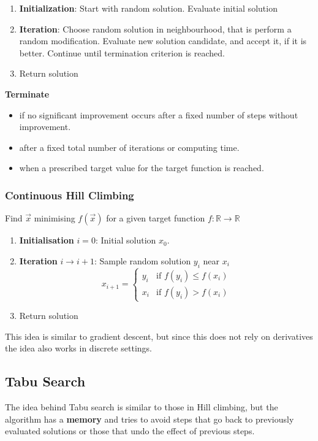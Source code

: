 \documentclass[11pt]{article}
\begin{document}
\begin{enumerate}
	\item \textbf{Initialization}: Start with random solution. Evaluate initial solution
	\item \textbf{Iteration}: Choose random solution in neighbourhood, that is perform a random modification. Evaluate new solution candidate, and accept it, if it is better. Continue until termination criterion is reached.
	\item Return solution
\end{enumerate}

\noindent
\textbf{Terminate}
\begin{itemize}
	\item if no significant improvement occurs after a fixed number of steps without improvement.
	\item after a fixed total number of iterations or computing time.
	\item when a prescribed target value for the target function is reached.
\end{itemize}

\subsubsection{Continuous Hill Climbing}
Find $\vec{x}$ minimising $f(\vec{x})$ for a given target function $f : \mathbb{R} \rightarrow \mathbb{R}$
\begin{enumerate}
	\item \textbf{Initialisation} $i=0$: Initial solution $x_0$.
	\item \textbf{Iteration} $i \rightarrow i+1$: Sample random solution $y_i$ near $x_i$
	\begin{equation*}
		x_{i+1} = \left\{ \begin{matrix}
		y_i & \text{if } f(y_i) \leq f(x_i)\\
		x_i & \text{if } f(y_i) > f(x_i)
		\end{matrix} \right.
	\end{equation*}
	\item Return solution
\end{enumerate}

This idea is similar to gradient descent, but since this does not rely on derivatives the idea also works in discrete settings.

\subsection{Tabu Search}
The idea behind Tabu search is similar to those in Hill climbing, but the algorithm has a \textbf{memory} and tries to avoid steps that go back to previously evaluated solutions or those that undo the effect of previous steps.
\end{document}
